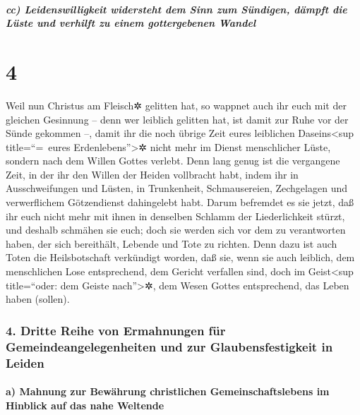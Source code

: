 \hypertarget{cc-leidenswilligkeit-widersteht-dem-sinn-zum-suxfcndigen-duxe4mpft-die-luxfcste-und-verhilft-zu-einem-gottergebenen-wandel}{%
\subparagraph{cc) Leidenswilligkeit widersteht dem Sinn zum Sündigen,
dämpft die Lüste und verhilft zu einem gottergebenen
Wandel}\label{cc-leidenswilligkeit-widersteht-dem-sinn-zum-suxfcndigen-duxe4mpft-die-luxfcste-und-verhilft-zu-einem-gottergebenen-wandel}}

\hypertarget{section-3}{%
\section{4}\label{section-3}}

 Weil nun Christus am Fleisch✲ gelitten hat, so wappnet
auch ihr euch mit der gleichen Gesinnung -- denn wer leiblich gelitten
hat, ist damit zur Ruhe vor der Sünde gekommen --,  damit
ihr die noch übrige Zeit eures leiblichen Daseins\textless sup
title=``=~eures Erdenlebens''\textgreater✲ nicht mehr im Dienst
menschlicher Lüste, sondern nach dem Willen Gottes verlebt.
 Denn lang genug ist die vergangene Zeit, in der ihr den
Willen der Heiden vollbracht habt, indem ihr in Ausschweifungen und
Lüsten, in Trunkenheit, Schmausereien, Zechgelagen und verwerflichem
Götzendienst dahingelebt habt.  Darum befremdet es sie
jetzt, daß ihr euch nicht mehr mit ihnen in denselben Schlamm der
Liederlichkeit stürzt, und deshalb schmähen sie euch; 
doch sie werden sich vor dem zu verantworten haben, der sich bereithält,
Lebende und Tote zu richten.  Denn dazu ist auch Toten die
Heilsbotschaft verkündigt worden, daß sie, wenn sie auch leiblich, dem
menschlichen Lose entsprechend, dem Gericht verfallen sind, doch im
Geist\textless sup title=``oder: dem Geiste nach''\textgreater✲, dem
Wesen Gottes entsprechend, das Leben haben (sollen).

\hypertarget{dritte-reihe-von-ermahnungen-fuxfcr-gemeindeangelegenheiten-und-zur-glaubensfestigkeit-in-leiden}{%
\subsubsection{4. Dritte Reihe von Ermahnungen für
Gemeindeangelegenheiten und zur Glaubensfestigkeit in
Leiden}\label{dritte-reihe-von-ermahnungen-fuxfcr-gemeindeangelegenheiten-und-zur-glaubensfestigkeit-in-leiden}}

\hypertarget{a-mahnung-zur-bewuxe4hrung-christlichen-gemeinschaftslebens-im-hinblick-auf-das-nahe-weltende}{%
\paragraph{a) Mahnung zur Bewährung christlichen Gemeinschaftslebens im
Hinblick auf das nahe
Weltende}\label{a-mahnung-zur-bewuxe4hrung-christlichen-gemeinschaftslebens-im-hinblick-auf-das-nahe-weltende}}

